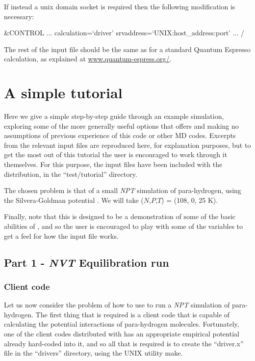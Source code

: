 \documentclass[11pt,english,fleqn]{report}
\newenvironment{code}{%
\footnotesize 
\verbatim
}{
\endverbatim
\normalsize
}
\begin{document}
If instead a unix domain socket is required then the following
modification is necessary:


\begin{code}
&CONTROL
   ...
   calculation=`driver'
   srvaddress=`UNIX:host_address:port'
   ...
/
\end{code}

The rest of the input file should be the same as for a standard Quantum
Espresso calculation, as explained at \url{www.quantum-espress.org/}.


\section{A simple tutorial}



Here we give a simple step-by-step guide through an example
simulation, exploring
some of the more generally useful options that \ipi offers and making
no assumptions of previous experience of this code or other MD codes.
Excerpts from the relevant input files are reproduced here, for explanation
purposes, but to get the most out of this tutorial the user is encouraged
to work through it themselves. For this purpose, the input files
have been included with the \ipi distribution, in the {}``test/tutorial''
directory.

The chosen problem is that of a small \emph{NPT} simulation of para-hydrogen, 
using the Silvera-Goldman potential \cite{silv-gold78jcp}. 
We will take (\(N\),\(P\),\(T\)) = (108, 0, 25 K).

Finally, note that this is designed to be a demonstration of some
of the basic abilities of \ipi, and so the user is encouraged to
play with some of the variables to get a feel for how the input file
works. 

\subsection{Part 1 - \emph{NVT} Equilibration run}


\subsubsection{Client code}

Let us now consider the problem of how to use \ipi to run a \emph{NPT}
simulation of para-hydrogen. The first thing that is required is a
client code that is capable of calculating the potential interactions
of para-hydrogen molecules. Fortunately, one of the client codes distributed
with \ipi has an appropriate empirical potential already hard-coded
into it, and
so all that is required is to create the {}``driver.x'' file in
the {}``drivers'' directory, using the UNIX utility make.
\end{document}
